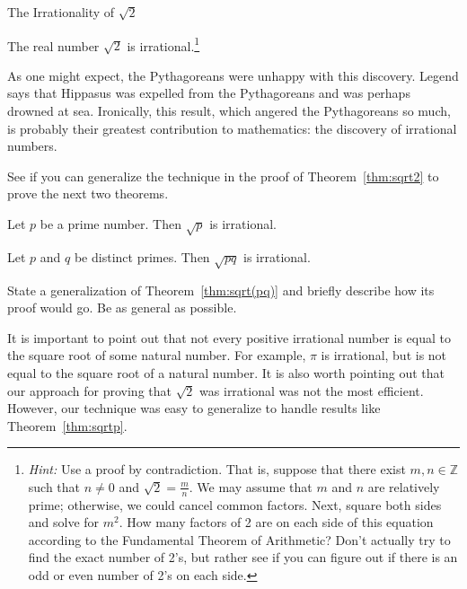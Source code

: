 \begin{section}{The Irrationality of $\sqrt{2}$}
%

\begin{theorem}\label{thm:sqrt2}
The real number $\sqrt{2}$ is irrational.\footnote{\emph{Hint:} Use a proof by contradiction.  That is, suppose that there exist $m,n\in\mathbb{Z}$ such that $n\ne 0$ and $\sqrt{2}=\frac{m}{n}$. We may assume that $m$ and $n$ are relatively prime; otherwise, we could cancel common factors. Next, square both sides and solve for $m^2$. How many factors of 2 are on each side of this equation according to the Fundamental Theorem of Arithmetic? Don't actually try to find the exact number of 2's, but rather see if you can figure out if there is an odd or even number of 2's on each side.}
\end{theorem}

As one might expect, the Pythagoreans were unhappy with this discovery. Legend says that Hippasus was expelled from the Pythagoreans and was perhaps drowned at sea. Ironically, this result, which angered the Pythagoreans so much, is probably their greatest contribution to mathematics: the discovery of irrational numbers.

See if you can generalize the technique in the proof of Theorem~\ref{thm:sqrt2} to prove the next two theorems.

\begin{theorem}\label{thm:sqrtp}
Let $p$ be a prime number.  Then $\sqrt{p}$ is irrational.
\end{theorem}

\begin{theorem}\label{thm:sqrt(pq)}
Let $p$ and $q$ be distinct primes.  Then $\sqrt{pq}$ is irrational.
\end{theorem}

\begin{problem}
State a generalization of Theorem~\ref{thm:sqrt(pq)} and briefly describe how its proof would go.  Be as general as possible.
\end{problem}

It is important to point out that not every positive irrational number is equal to the square root of some natural number.  For example, $\pi$ is irrational, but is not equal to the square root of a natural number. It is also worth pointing out that our approach for proving that $\sqrt{2}$ was irrational was not the most efficient.  However, our technique was easy to generalize to handle results like Theorem~\ref{thm:sqrtp}.

\end{section}

